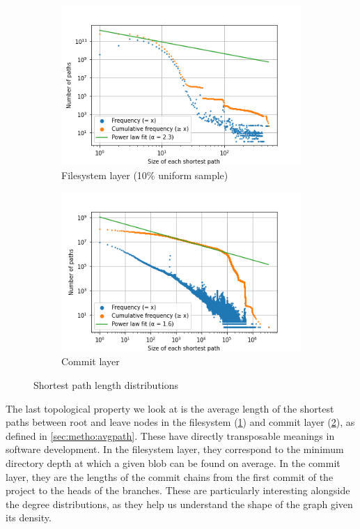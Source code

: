 \begin{figure}
    \centering
    \begin{subfigure}{.49\textwidth}
        \includegraphics[width=\linewidth]{img/topology/avgpath/dir+cnt}
        \caption{Filesystem layer (10\% uniform sample)}
        \label{fig:avgpath_dir+cnt}
    \end{subfigure}\hfill
    \begin{subfigure}{.49\textwidth}
        \includegraphics[width=\linewidth]{img/topology/avgpath/rev}
        \caption{Commit layer}
        \label{fig:avgpath_rev}
    \end{subfigure}
    \caption{Shortest path length distributions}
    \label{fig:avgpath}
\end{figure}

The last topological property we look at is the average length of the shortest
paths between root and leave nodes in the filesystem
(\cref{fig:avgpath_dir+cnt}) and commit layer (\cref{fig:avgpath_rev}), as
defined in \cref{sec:metho:avgpath}.
These have directly transposable meanings in software development. In the
filesystem layer, they correspond to the minimum directory depth at which a
given blob can be found on average. In the commit layer, they are the lengths
of the commit chains from the first commit of the project to the heads of the
branches.  These are particularly interesting alongside the degree
distributions, as they help us understand the shape of the graph given its
density.

